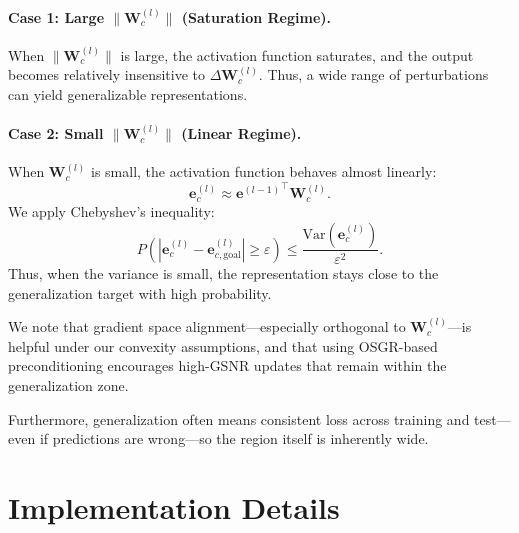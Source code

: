 \documentclass{article}
\theoremstyle{plain}
\theoremstyle{definition}
\theoremstyle{remark}
\begin{document}
\paragraph{Case 1: Large $\|\mathbf{W}^{(l)}_c\|$ (Saturation Regime).}
When $\|\mathbf{W}^{(l)}_c\|$ is large, the activation function saturates, and the output becomes relatively insensitive to $\Delta \mathbf{W}^{(l)}_c$. Thus, a wide range of perturbations can yield generalizable representations.

\paragraph{Case 2: Small $\|\mathbf{W}^{(l)}_c\|$ (Linear Regime).}
When $\mathbf{W}^{(l)}_c$ is small, the activation function behaves almost linearly:
\begin{equation}
     {\mathbf{e}_c^{(l)}}  \approx {\mathbf{e}^{(l-1)}}^{\top}\mathbf{W}_c^{(l)} .
\end{equation}
We apply Chebyshev's inequality:
\begin{equation}
    P\left( \left| \mathbf{e}_c^{(l)} - \mathbf{e}_{c,\text{goal}}^{(l)} \right| \geq \varepsilon \right) \leq \frac{\text{Var}(\mathbf{e}_c^{(l)})}{\varepsilon^2}.
\end{equation}
Thus, when the variance is small, the representation stays close to the generalization target with high probability.

We note that gradient space alignment—especially orthogonal to $\mathbf{W}^{(l)}_c$—is helpful under our convexity assumptions, and that using OSGR-based preconditioning encourages high-GSNR updates that remain within the generalization zone.

Furthermore, generalization often means consistent loss across training and test—even if predictions are wrong—so the region itself is inherently wide.

\section{Implementation Details}




\label{sec:rationale}
\end{document}
